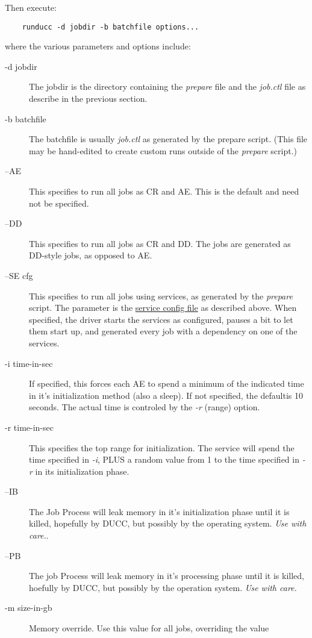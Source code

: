     Then execute:
\begin{verbatim}
    runducc -d jobdir -b batchfile options...
\end{verbatim}
    where the various parameters and options include:
    \begin{description}
      \item[-d jobdir] The jobdir is the directory containing the {\em prepare} file and the
        {\em job.ctl} file as describe in the previous section.
      \item[-b batchfile] The batchfile is usually {\em job.ctl} as generated by the
        prepare script.  (This file may be hand-edited to create custom runs outside
        of the {\em prepare} script.)
      \item[--AE] This specifies to run all jobs as CR and AE.  This is the default and
        need not be specified.
      \item[--DD] This specifies to run all jobs as CR and DD.  The jobs are generated as
        DD-style jobs, as opposed to AE.
      \item[--SE cfg] This specifies to run all jobs using services, as generated by the {\em
          prepare} script.  The parameter is the \hyperref[subsec:simulation.services]{service
          config file} as described above. When specified, the driver starts the services
        as configured, pauses a bit to let them start up, and generated every job with a
        dependency on one of the services.
      \item[-i time-in-sec] If specified, this forces each AE to spend a minimum of the indicated time
        in it's initialization method (also a sleep). If not specified, the defaultis
        10 seconds. The actual time is controled by the {\em -r} (range) option.
      \item[-r time-in-sec] This specifies the top range for initialization.  The service
        will spend the time specified in {\em -i}, PLUS a random value from 1 to
        the time specified in {\em -r} in its initialization phase.
      \item[--IB] The Job Process will leak memory in it's initialization phase until it is killed, hopefully by
        DUCC, but possibly by the operating system.  {\em Use with care.}.
      \item[--PB] The job Process will leak memory in it's processing phase until it is killed, hoefully 
        by DUCC, but possibly by the operation system. {\em Use with care.}
      \item[-m size-in-gb] Memory override.  Use this value for all jobs, overriding the value

\end{description}

